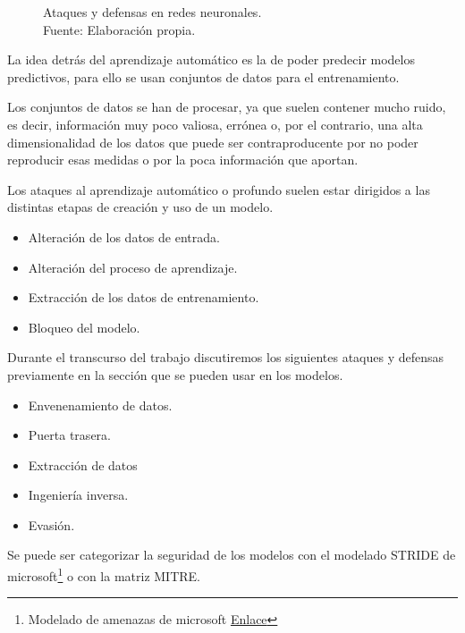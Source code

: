 \begin{figure}[H]
    \centering
    \centerline{}
    \caption{Ataques y defensas en redes neuronales.\\Fuente: Elaboración propia.}
    \label{fig:art-for-red-and-blue-teams}
\end{figure}

La idea detrás del aprendizaje automático es la de poder predecir modelos predictivos, para ello se usan conjuntos de datos para el entrenamiento.

Los conjuntos de datos se han de procesar, ya que suelen contener mucho ruido, es decir, información muy poco valiosa, errónea o, por el contrario, una alta dimensionalidad de los datos que puede ser contraproducente por no poder reproducir esas medidas o por la poca información que aportan.

Los ataques al aprendizaje automático o profundo suelen estar dirigidos a las distintas etapas de creación y uso de un modelo.

\begin{itemize}
    \item Alteración de los datos de entrada.
    \item Alteración del proceso de aprendizaje.
    \item Extracción de los datos de entrenamiento.
    \item Bloqueo del modelo.
\end{itemize}

Durante el transcurso del trabajo discutiremos los siguientes ataques y defensas previamente en la sección  que se pueden usar en los modelos.

\begin{itemize}
    \item Envenenamiento de datos.
    \item Puerta trasera.
    \item Extracción de datos
    \item Ingeniería inversa.
    \item Evasión.
\end{itemize}

Se puede ser categorizar la seguridad de los modelos con el modelado \gls{STRIDE} de microsoft\footnote{Modelado de amenazas de microsoft \href{https://learn.microsoft.com/es-es/azure/security/develop/threat-modeling-tool-threats}{Enlace}} o con la matriz \gls{MITRE}.

